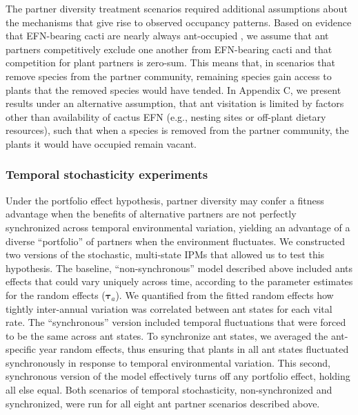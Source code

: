 \documentclass[11pt]{article}
\begin{document}
The partner diversity treatment scenarios required additional assumptions about the mechanisms that give rise to observed occupancy patterns. 
Based on evidence that EFN-bearing cacti are nearly always ant-occupied \citep{Miller2014}, we assume that ant partners competitively exclude one another from EFN-bearing cacti and that competition for plant partners is zero-sum. 
This means that, in scenarios that remove species from the partner community, remaining species gain access to plants that the removed species would have tended. 
In Appendix C, we present results under an alternative assumption, that ant visitation is limited by factors other than availability of cactus EFN (e.g., nesting sites or off-plant dietary resources), such that when a species is removed from the partner community, the plants it would have occupied remain vacant. 

\subsubsection*{Temporal stochasticity experiments}
Under the portfolio effect hypothesis, partner diversity may confer a fitness advantage when the benefits of alternative partners are not perfectly synchronized across temporal environmental variation, yielding an advantage of a diverse ``portfolio'' of partners when the environment fluctuates. 
We constructed two versions of the stochastic, multi-state IPMs that allowed us to test this hypothesis.
The baseline, ``non-synchronous'' model described above included ants effects that could vary uniquely across time, according to the parameter estimates for the random effects ($\pmb{\tau}_{a}$). 
We quantified from the fitted random effects how tightly inter-annual variation was correlated between ant states for each vital rate.
The ``synchronous'' version included temporal fluctuations that were forced to be the same across ant states. 
To synchronize ant states, we averaged the ant-specific year random effects, thus ensuring that plants in all ant states fluctuated synchronously in response to temporal environmental variation. 
This second, synchronous version of the model effectively turns off any portfolio effect, holding all else equal. 
Both scenarios of temporal stochasticity, non-synchronized and synchronized, were run for all eight ant partner scenarios described above. 
\end{document}
